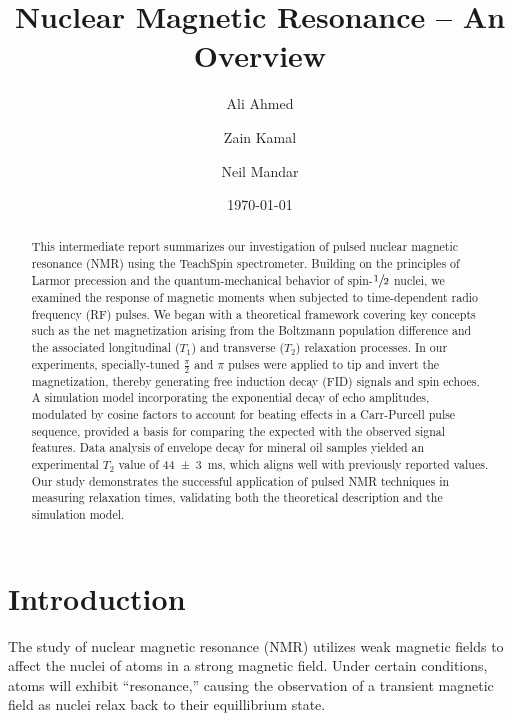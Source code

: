\documentclass[%
 reprint,
 amsmath,amssymb,
 aps,
]{revtex4-2}
\newcommand{\half}{$\sfrac{1}{2}$ }
\newcommand{\halfpi}{\frac{\pi}{2}}
\begin{document}

\title{Nuclear Magnetic Resonance -- An Overview}

\author{Ali Ahmed}
\author{Zain Kamal}%
\author{Neil Mandar}%



\date{\today}%

\begin{abstract}
This intermediate report summarizes our investigation of pulsed nuclear magnetic resonance (NMR) using the TeachSpin spectrometer. Building on the principles of Larmor precession and the quantum-mechanical behavior of spin-\half nuclei, we examined the response of magnetic moments when subjected to time-dependent radio frequency (RF) pulses. We began with a theoretical framework covering key concepts such as the net magnetization arising from the Boltzmann population difference and the associated longitudinal ($T_1$) and transverse ($T_2$) relaxation processes. In our experiments, specially-tuned $\halfpi$ and $\pi$ pulses were applied to tip and invert the magnetization, thereby generating free induction decay (FID) signals and spin echoes. A simulation model incorporating the exponential decay of echo amplitudes, modulated by cosine factors to account for beating effects in a Carr-Purcell pulse sequence, provided a basis for comparing the expected with the observed signal features. Data analysis of envelope decay for mineral oil samples yielded an experimental $T_2$ value of \SI[uncertainty-mode=separate]{44\pm3}{\milli\second}, which aligns well with previously reported values. Our study demonstrates the successful application of pulsed NMR techniques in measuring relaxation times, validating both the theoretical description and the simulation model.
\end{abstract}

\maketitle


\section{\label{sec:intro}Introduction}

The study of nuclear magnetic resonance (NMR) utilizes weak magnetic fields to affect the nuclei of atoms in a strong magnetic field. Under certain conditions, atoms will exhibit ``resonance,'' causing the observation of a transient magnetic field as nuclei relax back to their equillibrium state. 
\end{document}
